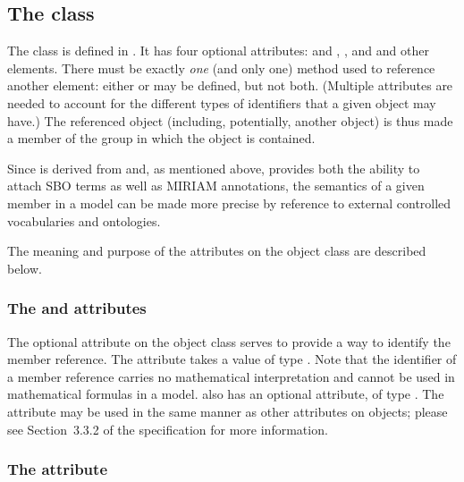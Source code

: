 \subsection{The  class}
\label{member-class}

The \Member class is defined in .  It has four optional attributes:  and , , and  and   other elements.  There must be exactly \emph{one} (and only one) method used to reference another element: either  or  may be defined, but not both.  (Multiple attributes are needed to account for the different types of identifiers that a given object may have.)  The referenced object (including, potentially, another \Group object) is thus made a member of the group in which the \Member object is contained.

Since \Member is derived from \SBase and, as mentioned above, \SBase provides both the ability to attach SBO terms as well as MIRIAM annotations, the semantics of a given member in a model can be made more precise by reference to external controlled vocabularies and ontologies.

The meaning and purpose of the attributes on the object class are described below.


\subsubsection{The \fixttspace{} and \fixttspace{} attributes}
\label{member-idname-attributes}

The optional  attribute on the \Member object class serves to provide a way to identify the member reference.  The attribute takes a value of type .  Note that the identifier of a member reference carries no mathematical interpretation and cannot be used in mathematical formulas in a model.  \Member also has an optional  attribute, of type .  The  attribute may be used in the same manner as other  attributes on \sbmlthreecore objects; please see Section~3.3.2 of the \sbmlthreecore specification for more information.


\subsubsection{The \fixttspace{} attribute}
\label{member-idref-attribute}

